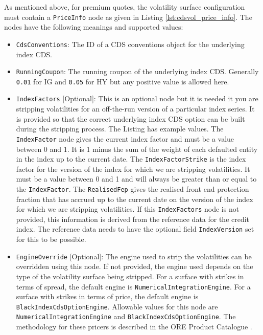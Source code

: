 As mentioned above, for premium quotes, the volatility surface configuration must contain a \lstinline!PriceInfo! node 
as given in Listing \ref{lst:cdsvol_price_info}. The nodes have the following meanings and supported values:
\begin{itemize}

\item
\lstinline!CdsConventions!: The ID of a CDS conventions object for the underlying index CDS.

\item
\lstinline!RunningCoupon!: The running coupon of the underlying index CDS.
Generally \lstinline!0.01! for IG and \lstinline!0.05! for HY but any positive value is allowed here.

\item
\lstinline!IndexFactors! [Optional]: This is an optional node but it is needed it you are stripping volatilities for 
an off-the-run version of a particular index series. It is provided so that the correct underlying index CDS option 
can be built during the stripping process. The Listing has example values. The \lstinline!IndexFactor! node gives the 
current index factor and must be a value between 0 and 1. It is 1 minus the sum of the weight of each defaulted entity 
in the index up to the current date. The \lstinline!IndexFactorStrike! is the index factor for the version of the index 
for which we are stripping volatilities. It must be a value between 0 and 1 and will always be greater than or equal to 
the \lstinline!IndexFactor!. The \lstinline!RealisedFep! gives the realised front end protection fraction that has 
accrued up to the current date on the version of the index for which we are stripping volatilities.
If this \lstinline!IndexFactors! node is not provided, this information is derived from the reference data for the 
credit index. The reference data needs to have the optional field \lstinline!IndexVersion! set for this to be possible.

\item
\lstinline!EngineOverride! [Optional]: The engine used to strip the volatilities can be overridden using this node.
If not provided, the engine used depends on the type of the volatility surface being stripped.
For a surface with strikes in terms of spread, the default engine is \lstinline!NumericalIntegrationEngine!.
For a surface with strikes in terms of price, the default engine is \lstinline!BlackIndexCdsOptionEngine!.
Allowable values for this node are \lstinline!NumericalIntegrationEngine! and \lstinline!BlackIndexCdsOptionEngine!.
The methodology for these pricers is described in the ORE Product Catalogue \cite{products}.


\end{itemize}
